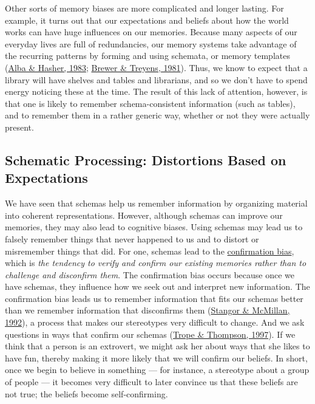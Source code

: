 \documentclass[
]{krantz}
\begin{document}
Other sorts of memory biases are more complicated and longer lasting. For example, it turns out that our expectations and beliefs about how the world works can have huge influences on our memories. Because many aspects of our everyday lives are full of redundancies, our memory systems take advantage of the recurring patterns by forming and using schemata, or memory templates (\protect\hyperlink{ref-Alba1983}{Alba \& Hasher, 1983}; \protect\hyperlink{ref-brewer1981role}{Brewer \& Treyens, 1981}). Thus, we know to expect that a library will have shelves and tables and librarians, and so we don't have to spend energy noticing these at the time. The result of this lack of attention, however, is that one is likely to remember schema-consistent information (such as tables), and to remember them in a rather generic way, whether or not they were actually present.

\hypertarget{schematic-processing-distortions-based-on-expectations}{%
\subsection*{Schematic Processing: Distortions Based on Expectations}\label{schematic-processing-distortions-based-on-expectations}}


We have seen that schemas help us remember information by organizing material into coherent representations. However, although schemas can improve our memories, they may also lead to cognitive biases. Using schemas may lead us to falsely remember things that never happened to us and to distort or misremember things that did. For one, schemas lead to the \protect\hyperlink{confirmation-bias-1}{confirmation bias}, which is \emph{the tendency to verify and confirm our existing memories rather than to challenge and disconfirm them}. The confirmation bias occurs because once we have schemas, they influence how we seek out and interpret new information. The confirmation bias leads us to remember information that fits our schemas better than we remember information that disconfirms them (\protect\hyperlink{ref-stangor1992memory}{Stangor \& McMillan, 1992}), a process that makes our stereotypes very difficult to change. And we ask questions in ways that confirm our schemas (\protect\hyperlink{ref-trope1997looking}{Trope \& Thompson, 1997}). If we think that a person is an extrovert, we might ask her about ways that she likes to have fun, thereby making it more likely that we will confirm our beliefs. In short, once we begin to believe in something --- for instance, a stereotype about a group of people --- it becomes very difficult to later convince us that these beliefs are not true; the beliefs become self-confirming.
\end{document}
